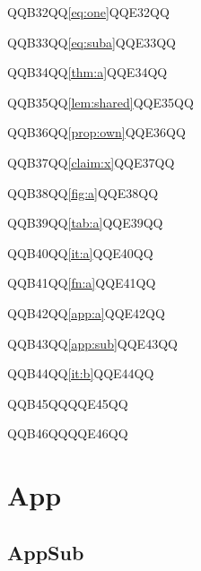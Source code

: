 \documentclass{article}
\begin{document}
QQB32QQ\autoref{eq:one}QQE32QQ\par
QQB33QQ\autoref{eq:suba}QQE33QQ\par
QQB34QQ\autoref{thm:a}QQE34QQ\par
QQB35QQ\autoref{lem:shared}QQE35QQ\par
QQB36QQ\autoref{prop:own}QQE36QQ\par
QQB37QQ\autoref{claim:x}QQE37QQ\par
QQB38QQ\autoref{fig:a}QQE38QQ\par
QQB39QQ\autoref{tab:a}QQE39QQ\par
QQB40QQ\autoref{it:a}QQE40QQ\par
QQB41QQ\autoref{fn:a}QQE41QQ\par
QQB42QQ\autoref{app:a}QQE42QQ\par
QQB43QQ\autoref{app:sub}QQE43QQ\par
QQB44QQ\ref{it:b}QQE44QQ\par
QQB45QQQQE45QQ\par
QQB46QQQQE46QQ\par
\appendix
\section{App}\label{app:a}
\subsection{AppSub}\label{app:sub}
\end{document}
